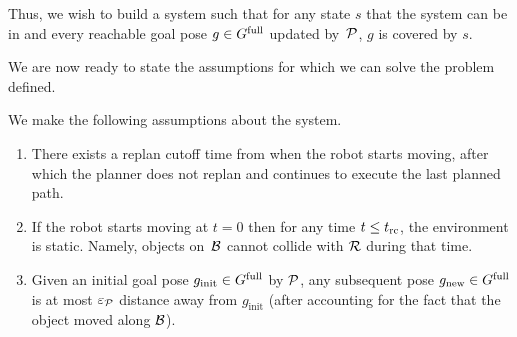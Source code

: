 \documentclass[conference]{IEEEtran}
\begin{document}
Thus, we wish to build a system such that 
for any state $s$ that the system can be in 
and every reachable goal pose $g \in G^{\textrm{full}}$ updated by~$\mathcal{P}$,
$g$ is covered by $s$.


We are now ready to state the assumptions for which we can solve the problem defined.

We make the following assumptions about the system.
\begin{enumerate}[label={\textbf{A\arabic*}},leftmargin=0.75cm]
    

    \item \label{assum:4} There exists a replan cutoff time \Trc from when the robot starts moving, after which the planner does not replan and continues to execute the last planned path.

    \item \label{assum:5} If the robot starts moving at $t = 0$ then for any time $t \leq t_{\textrm{rc}}$, the environment is static. Namely, objects on~$\mathcal{B}$ cannot collide with $\mathcal{R}$ during that time.
    
    \item \label{assum:3} Given an initial goal pose $g_{\textrm{init}} \in G^{\textrm{full}}$ by $\mathcal{P}$, any subsequent pose $g_{\textrm{new}} \in G^{\textrm{full}}$ is at most $\varepsilon_\mathcal{P}$ distance away from $g_{\textrm{init}}$ (after accounting for the fact that the object moved along $\mathcal{B}$).
    

\end{enumerate}
\end{document}
